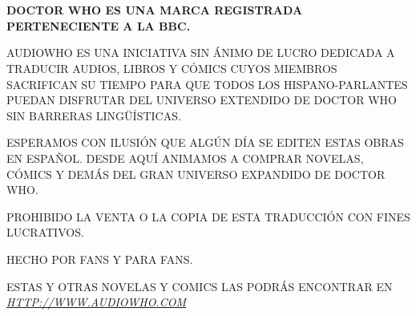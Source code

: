 \chapter*{}
\vfill
\begin{center}

 \textbf{DOCTOR WHO ES UNA MARCA REGISTRADA PERTENECIENTE A LA BBC.}

 \vspace{3mm}

 {AUDIOWHO ES UNA INICIATIVA SIN ÁNIMO DE LUCRO DEDICADA A TRADUCIR AUDIOS, LIBROS
  Y CÓMICS CUYOS MIEMBROS SACRIFICAN SU TIEMPO PARA QUE TODOS LOS
  HISPANO-PARLANTES PUEDAN DISFRUTAR DEL UNIVERSO EXTENDIDO DE DOCTOR
 WHO SIN BARRERAS LINGÜÍSTICAS.}

 \vspace{3mm}

 {ESPERAMOS CON ILUSIÓN QUE ALGÚN DÍA SE EDITEN ESTAS OBRAS EN ESPAÑOL.\@
  DESDE AQUÍ ANIMAMOS A COMPRAR NOVELAS, CÓMICS Y DEMÁS DEL GRAN UNIVERSO
 EXPANDIDO DE DOCTOR WHO.}


 \vspace{3mm}

 {PROHIBIDO LA VENTA O LA COPIA DE ESTA TRADUCCIÓN CON FINES LUCRATIVOS.}

 \vspace{3mm}

 {HECHO POR FANS Y PARA FANS.}

 \vspace{3mm}

 ESTAS Y OTRAS NOVELAS Y COMICS LAS PODRÁS ENCONTRAR EN
 \href{http://www.audiowho.com}{\textit{HTTP://WWW.AUDIOWHO.COM}}
\end{center}
